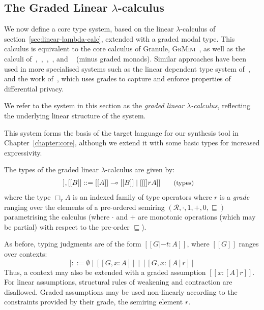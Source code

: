 \subsection{The Graded Linear $\lambda$-calculus}
\label{sec:linear-base}
We now define a core type system, based on the linear $\lambda$-calculus of
section~\ref{sec:linear-lambda-calc}, extended with a graded modal type. This
calculus is equivalent to the core calculus of Granule,
\textsc{GrMini}~\citep{DBLP:journals/pacmpl/OrchardLE19}, as well as the calculi
of~\citet{DBLP:conf/esop/BrunelGMZ14},~\citet{DBLP:conf/esop/GhicaS14},~\citet{coeffects-thesis},~\citet{petricek2014coeffects},
and ~\citet{DBLP:conf/icfp/GaboardiKOBU16} (minus graded monads). Similar
approaches have been used in more specialised systems such as the linear
dependent type system of~\citet{Lago_2012}, and the work
of~\citet{gaboardi2013linear}, which uses grades to capture and enforce
properties of differential privacy.

We refer to the system in this section as the \textit{graded
linear $\lambda$-calculus}, reflecting the underlying linear structure of the
system.


This system forms the basis of the target language for our synthesis tool in
Chapter~\ref{chapter:core}, although we extend it with some basic types for 
increased expressivity.

The types of the graded linear $\lambda$-calculus are given by:
\begin{align*}
[[ A ]] , [[ B ]] & ::=
       [[ A ]] \multimap [[ B ]]
  \mid [[ [] r A ]]
{\small{\tag{types}}}
\end{align*}
where the type $\Box_{r} A$ is an indexed family of type operators where $r$ is
a \textit{grade} ranging over the elements of a pre-ordered semiring
$({\mathcal{R}}, \cdot, {1}, {+}, {0}, {\sqsubseteq})$ parametrising the
calculus (where $\cdot$ and $+$ are monotonic operations (which may be partial)
with respect to the pre-order $\sqsubseteq$). 

As before, typing judgments are of the form $[[ G |- t : A ]]$, where $[[ G ]]$
ranges over contexts:
\begin{equation*}
  [[ G ]] ::= \emptyset
  \mid [[ G , x : A ]]
  \mid [[ G , x : [ A ] r ]]
\tag{contexts}
\end{equation*}
Thus, a context may also be extended with a graded assumption $[[x : [A] r]]$.
For linear assumptions, structural rules of weakening and contraction are
disallowed. Graded assumptions may be used non-linearly according to the
constraints provided by their grade, the semiring element $r$. 

